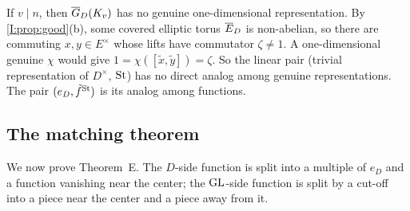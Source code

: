 \begin{remark}\label{II:rem:nochar}
If $v\mid n$, then $\overline{G}_D(K_v)$ has no genuine one-dimensional representation. By \cref{I:prop:good}(b), some covered elliptic torus $\overline{E}_D$ is non-abelian, so there are commuting $x,y\in E^\times$ whose lifts have commutator $\zeta\ne1$. A one-dimensional genuine $\chi$ would give $1=\chi([\tilde x,\tilde y])=\zeta$. So the linear pair (trivial representation of $D^\times$, $\mathrm{St}$) has no direct analog among genuine representations. The pair $(e_D,\tilde f^{\mathrm{St}})$ is its analog among functions.
\end{remark}


\subsection{The matching theorem}\label{II:subsec:matchthm}
We now prove Theorem~E. The $D$-side function is split into a multiple of $e_D$ and a function vanishing near the center; the $\mathrm{GL}$-side function is split by a cut-off into a piece near the center and a piece away from it.

